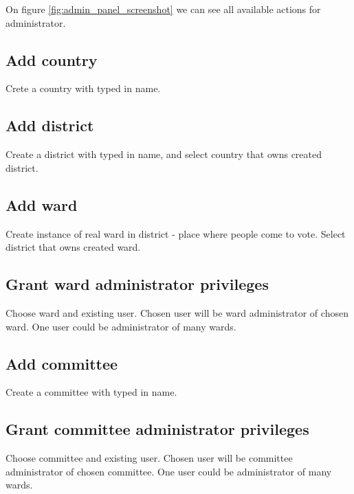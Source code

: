 \documentclass[a4paper,twoside,12pt]{book}
\begin{document}
    On figure \ref{fig:admin_panel_screenshot} we can see all available actions for administrator.
    \subsection{Add country}
      Crete a country with typed in name. 

    \subsection{Add district}
      Create a district with typed in name, and select country that owns created district.

    \subsection{Add ward}
      Create instance of real ward in district - place where people come to vote. 
      Select district that owns created ward.

    \subsection{Grant ward administrator privileges}
      Choose ward and existing user. Chosen user will be ward administrator of chosen ward. One user could be administrator of many wards.

    \subsection{Add committee}
      Create a committee with typed in name.

    \subsection{Grant committee administrator privileges}
      Choose committee and existing user. Chosen user will be committee administrator of chosen committee. One user could be administrator of many wards.
\end{document}
